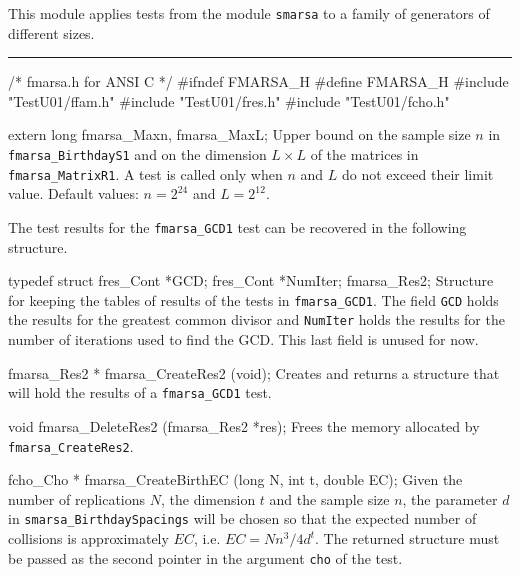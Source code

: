 
This module applies tests from the module {\tt smarsa}
to a family of generators of different sizes.


\bigskip\hrule
\code\hide
/* fmarsa.h for ANSI C */
#ifndef FMARSA_H
#define FMARSA_H
\endhide
#include "TestU01/ffam.h"
#include "TestU01/fres.h"
#include "TestU01/fcho.h"


extern long fmarsa_Maxn, fmarsa_MaxL;
\endcode
\tab
  Upper bound on the sample size $n$  in {\tt fmarsa\_BirthdayS1} and on
  the dimension  $L \times L$ of the matrices in {\tt fmarsa\_MatrixR1}.
  A test is called only when $n$ and $L$ do not exceed their limit value.
  Default values: $n = 2^{24}$ and $L = 2^{12}$.
\endtab

\ifdetailed  %



The test results for the {\tt fmarsa\_GCD1} test can be recovered
in the following structure.

\code

typedef struct {
   fres_Cont *GCD;
   fres_Cont *NumIter;
} fmarsa_Res2;
\endcode
 \tab
  Structure for keeping the tables of results of the tests in
  {\tt fmarsa\_GCD1}. The field {\tt GCD} holds the results for the
  greatest common divisor  and {\tt NumIter} holds the results for the
  number of iterations used to find the GCD.
  This last field is unused for now.
 \endtab
\code


fmarsa_Res2 * fmarsa_CreateRes2 (void);
\endcode
 \tab
  Creates and returns a structure that will hold the results
  of a  {\tt fmarsa\_GCD1} test.
 \endtab
\code


void fmarsa_DeleteRes2 (fmarsa_Res2 *res);
\endcode
 \tab
  Frees the memory allocated by {\tt fmarsa\_CreateRes2}.
 \endtab

\fi    %




\code

fcho_Cho * fmarsa_CreateBirthEC (long N, int t, double EC);
\endcode
 \tab
  Given the number of replications $N$, the dimension $t$ and the sample
  size $n$, the parameter $d$ in {\tt smarsa\_BirthdaySpacings} will be chosen
  so that the expected number of collisions is approximately $EC$,
  i.e. $EC = Nn^3/4d^t$.
  The returned structure must be passed as the second pointer in the
  argument {\tt cho} of the test.
 \endtab
\code


